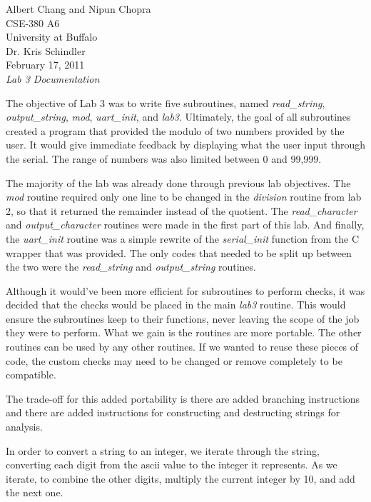 \documentclass[letterpaper,10pt]{article}
\begin{document}
    Albert Chang and Nipun Chopra\\
    CSE-380 A6\\
    University at Buffalo\\
    Dr. Kris Schindler\\
    February 17, 2011\\
    \textit{Lab 3 Documentation}

    The objective of Lab 3 was to write five subroutines, named
    \textit{read\_string}, \textit{output\_string}, \textit{mod},
    \textit{uart\_init}, and \textit{lab3}. Ultimately, the goal of all
    subroutines created a program that provided the modulo of two numbers
    provided by the user. It would give immediate feedback by displaying what
    the user input through the serial. The range of numbers was also limited
    between 0 and 99,999.

    The majority of the lab was already done through previous lab objectives.
    The \textit{mod} routine required only one line to be changed in the
    \textit{division} routine from lab 2, so that it returned the remainder
    instead of the quotient. The \textit{read\_character} and
    \textit{output\_character} routines were made in the first part of this lab.
    And finally, the \textit{uart\_init} routine was a simple rewrite of the
    \textit{serial\_init} function from the C wrapper that was provided. The
    only codes that needed to be split up between the two were the
    \textit{read\_string} and \textit{output\_string} routines.

    Although it would've been more efficient for subroutines to perform checks,
    it was decided that  the checks would be placed in the main \textit{lab3}
    routine. This would ensure the subroutines keep to their functions, never
    leaving the scope of the job they were to perform. What we gain is the
    routines are more portable. The other routines can be used by any other
    routines. If we wanted to reuse these pieces of code, the custom checks may
    need to be changed or remove completely to be compatible.
    
    The trade-off for this added portability is there are added branching
    instructions and there are added instructions for constructing and
    destructing strings for analysis.

    In order to convert a string to an integer, we iterate through the string,
    converting each digit from the ascii value to the integer it represents.
    As we iterate, to combine the other digits, multiply the current integer
    by 10, and add the next one.
\end{document}
